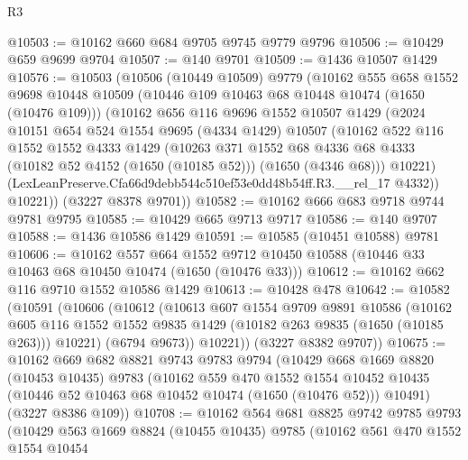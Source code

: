 \begin{lexlean}{R3}
\begin{coremodule}
@10503 := @10162 @660 @684 @9705 @9745 @9779 @9796
@10506 := @10429 @659 @9699 @9704
@10507 := @140 @9701
@10509 := @1436 @10507 @1429
@10576 := @10503
    (@10506
      (@10449 @10509)
      @9779
      (@10162
        @555
        @658
        @1552
        @9698
        @10448
        @10509
        (@10446 @109 @10463 @68 @10448 @10474 (@1650 (@10476 @109)))
        (@10162
          @656
          @116
          @9696
          @1552
          @10507
          @1429
          (@2024
            @10151
            @654
            @524
            @1554
            @9695
            (@4334 @1429)
            @10507
            (@10162
              @522
              @116
              @1552
              @1552
              @4333
              @1429
              (@10263
                @371
                @1552
                @68
                @4336
                @68
                @4333
                (@10182 @52 @4152 (@1650 (@10185 @52)))
                (@1650 (@4346 @68)))
              @10221)
            (LexLeanPreserve.Cfa66d9debb544c510ef53e0dd48b54ff.R3.__rel_17 @4332))
          @10221))
      (@3227 @8378 @9701))
@10582 := @10162 @666 @683 @9718 @9744 @9781 @9795
@10585 := @10429 @665 @9713 @9717
@10586 := @140 @9707
@10588 := @1436 @10586 @1429
@10591 := @10585 (@10451 @10588) @9781
@10606 := @10162
    @557
    @664
    @1552
    @9712
    @10450
    @10588
    (@10446 @33 @10463 @68 @10450 @10474 (@1650 (@10476 @33)))
@10612 := @10162 @662 @116 @9710 @1552 @10586 @1429
@10613 := @10428 @478
@10642 := @10582
    (@10591
      (@10606
        (@10612
          (@10613
            @607
            @1554
            @9709
            @9891
            @10586
            (@10162
              @605
              @116
              @1552
              @1552
              @9835
              @1429
              (@10182 @263 @9835 (@1650 (@10185 @263)))
              @10221)
            (@6794 @9673))
          @10221))
      (@3227 @8382 @9707))
@10675 := @10162
    @669
    @682
    @8821
    @9743
    @9783
    @9794
    (@10429
      @668
      @1669
      @8820
      (@10453 @10435)
      @9783
      (@10162
        @559
        @470
        @1552
        @1554
        @10452
        @10435
        (@10446 @52 @10463 @68 @10452 @10474 (@1650 (@10476 @52)))
        @10491)
      (@3227 @8386 @109))
@10708 := @10162
    @564
    @681
    @8825
    @9742
    @9785
    @9793
    (@10429
      @563
      @1669
      @8824
      (@10455 @10435)
      @9785
      (@10162
        @561
        @470
        @1552
        @1554
        @10454

\end{coremodule}
\end{lexlean}
